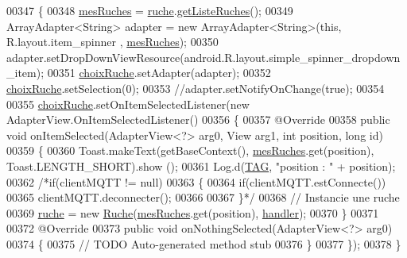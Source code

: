 \begin{DoxyCode}
00347                                        \{
00348         \hyperlink{classfr_1_1campus_1_1laurainc_1_1honeybee_1_1_graph_activity_ac3cf2f6b767bd189dc5c85ecbb48d0f6}{mesRuches} = \hyperlink{classfr_1_1campus_1_1laurainc_1_1honeybee_1_1_graph_activity_ae4312ed40c4a4bf731eb0834155165de}{ruche}.\hyperlink{classfr_1_1campus_1_1laurainc_1_1honeybee_1_1_ruche_a7108fb412c0628d3966aa8c76fd9e2b7}{getListeRuches}();
00349         ArrayAdapter<String> adapter = \textcolor{keyword}{new} ArrayAdapter<String>(\textcolor{keyword}{this}, R.layout.item\_spinner ,
      \hyperlink{classfr_1_1campus_1_1laurainc_1_1honeybee_1_1_graph_activity_ac3cf2f6b767bd189dc5c85ecbb48d0f6}{mesRuches});
00350         adapter.setDropDownViewResource(android.R.layout.simple\_spinner\_dropdown\_item);
00351         \hyperlink{classfr_1_1campus_1_1laurainc_1_1honeybee_1_1_graph_activity_ad937ed762b691b70747bb9f0b4d44994}{choixRuche}.setAdapter(adapter);
00352         \hyperlink{classfr_1_1campus_1_1laurainc_1_1honeybee_1_1_graph_activity_ad937ed762b691b70747bb9f0b4d44994}{choixRuche}.setSelection(0);
00353         \textcolor{comment}{//adapter.setNotifyOnChange(true);}
00354 
00355         \hyperlink{classfr_1_1campus_1_1laurainc_1_1honeybee_1_1_graph_activity_ad937ed762b691b70747bb9f0b4d44994}{choixRuche}.setOnItemSelectedListener(\textcolor{keyword}{new} AdapterView.OnItemSelectedListener()
00356         \{
00357             @Override
00358             \textcolor{keyword}{public} \textcolor{keywordtype}{void} onItemSelected(AdapterView<?> arg0, View arg1, \textcolor{keywordtype}{int} position, \textcolor{keywordtype}{long} \textcolor{keywordtype}{id})
00359             \{
00360                 Toast.makeText(getBaseContext(), \hyperlink{classfr_1_1campus_1_1laurainc_1_1honeybee_1_1_graph_activity_ac3cf2f6b767bd189dc5c85ecbb48d0f6}{mesRuches}.get(position), Toast.LENGTH\_SHORT).show
      ();
00361                 Log.d(\hyperlink{classfr_1_1campus_1_1laurainc_1_1honeybee_1_1_graph_activity_a23295afaba61fcec14a254a6359deea4}{TAG}, \textcolor{stringliteral}{"position : "} + position);
00362                 \textcolor{comment}{/*if(clientMQTT != null)
}
00363 \textcolor{comment}{                \{
}
00364 \textcolor{comment}{                    if(clientMQTT.estConnecte())
}
00365 \textcolor{comment}{                        clientMQTT.deconnecter();
}
00366 \textcolor{comment}{}
00367 \textcolor{comment}{                \}*/}
00368                 \textcolor{comment}{// Instancie une ruche}
00369                 \hyperlink{classfr_1_1campus_1_1laurainc_1_1honeybee_1_1_graph_activity_ae4312ed40c4a4bf731eb0834155165de}{ruche} = \textcolor{keyword}{new} \hyperlink{class_ruche}{Ruche}(\hyperlink{classfr_1_1campus_1_1laurainc_1_1honeybee_1_1_graph_activity_ac3cf2f6b767bd189dc5c85ecbb48d0f6}{mesRuches}.get(position), 
      \hyperlink{classfr_1_1campus_1_1laurainc_1_1honeybee_1_1_graph_activity_ac42217c5db8be9ce814ab813e2d3080c}{handler});
00370             \}
00371 
00372             @Override
00373             \textcolor{keyword}{public} \textcolor{keywordtype}{void} onNothingSelected(AdapterView<?> arg0)
00374             \{
00375                 \textcolor{comment}{// TODO Auto-generated method stub}
00376             \}
00377         \});
00378     \}
\end{DoxyCode}
